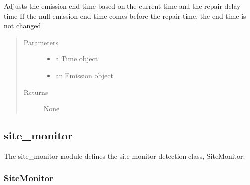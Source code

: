 \documentclass[letterpaper,10pt,english]{sphinxmanual}
\begin{document}
\begin{fulllineitems}
\begin{fulllineitems}
\label{\detokenize{index:feast.DetectionModules.repair.Repair.repair}}
Adjusts the emission end time based on the current time and the repair delay time
If the null emission end time comes before the repair time, the end time is not changed
\begin{quote}\begin{description}
\item[{Parameters}] \leavevmode\begin{itemize}
\item {} 
 \textendash{} a Time object

\item {} 
 \textendash{} an Emission object

\end{itemize}

\item[{Returns}] \leavevmode
None

\end{description}\end{quote}

\end{fulllineitems}


\end{fulllineitems}



\subsection{site\_monitor}
\label{\detokenize{index:module-feast.DetectionModules.site_monitor}}\label{\detokenize{index:site-monitor}}
The site\_monitor module defines the site monitor detection class, SiteMonitor.


\subsubsection{SiteMonitor}
\label{\detokenize{index:sitemonitor}}
\end{document}
